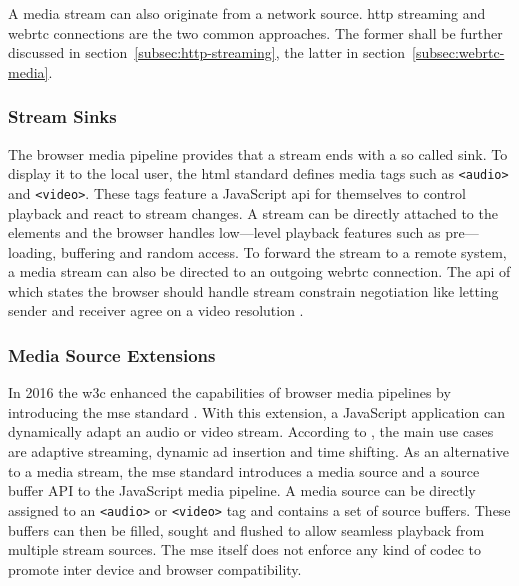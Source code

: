 A media stream can also originate from a network source. \Gls{http} streaming and \gls{webrtc} connections are the two common approaches. The former shall be further discussed in section~\ref{subsec:http-streaming}, the latter in section~\ref{subsec:webrtc-media}.

\subsubsection{Stream Sinks}

The browser media pipeline provides that a stream ends with a so called sink. To display it to the local user, the \gls{html} standard \cite[\S4.7]{html-w3c} defines media tags such as \lstinline|<audio>| and \lstinline|<video>|. These tags feature a JavaScript \gls{api} for themselves to control playback and react to stream changes. A stream can be directly attached to the elements and the browser handles low—level playback features such as pre—loading, buffering and random access. To forward the stream to a remote system, a media stream can also be directed to an outgoing \gls{webrtc} connection. The \gls{api} of which states the browser should handle stream constrain negotiation like letting sender and receiver agree on a video resolution \cite[\S5.1]{webrtc-w3c}.

\subsubsection{Media Source Extensions}

In 2016 the \gls{w3c} enhanced the capabilities of browser media pipelines by introducing the \gls{mse} standard \cite{TODO}. With this extension, a JavaScript application can dynamically adapt an audio or video stream. According to \cite{mse-google}, the main use cases are adaptive streaming, dynamic ad insertion and time shifting. As an alternative to a media stream, the \gls{mse} standard introduces a media source and a source buffer API to the JavaScript media pipeline. A media source can be directly assigned to an \lstinline|<audio>| or \lstinline|<video>| tag and contains a set of source buffers. These buffers can then be filled, sought and flushed to allow seamless playback from multiple stream sources. The \gls{mse} itself does not enforce any kind of codec to promote inter device and browser compatibility.

